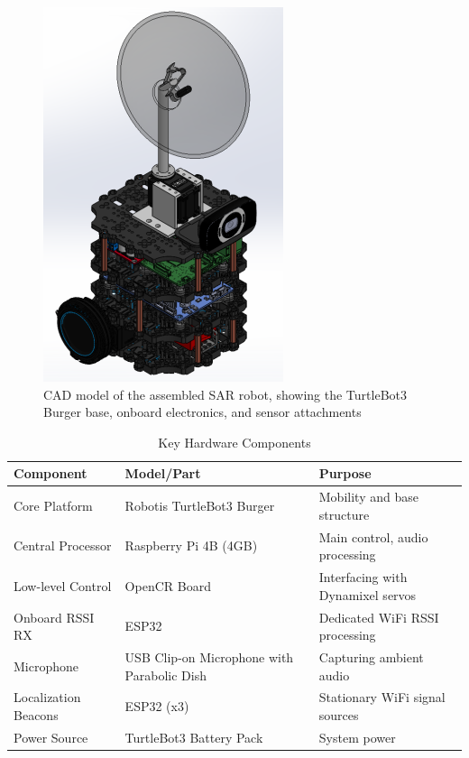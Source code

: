 \begin{figure}[!b]
  \centering
  \includegraphics[width=0.65\linewidth]{img/robotcad.png}
  \caption{CAD model of the assembled SAR robot, showing the TurtleBot3 Burger base, onboard electronics, and sensor attachments}
  \label{fig:robotCAD}
\end{figure}

\begin{table}[t]
  \caption{Key Hardware Components}
  \label{tab:hardware_components}
  \centering
  \begin{tabular}{lll}
    \toprule
    \textbf{Component} & \textbf{Model/Part} & \textbf{Purpose} \\
    \midrule
    Core Platform & Robotis TurtleBot3 Burger & Mobility and base structure \\
    Central Processor & Raspberry Pi 4B (4GB) & Main control, audio processing \\
    Low-level Control & OpenCR Board & Interfacing with Dynamixel servos \\
    Onboard RSSI RX & ESP32 & Dedicated WiFi RSSI processing \\
    Microphone & USB Clip-on Microphone with Parabolic Dish & Capturing ambient audio \\
    Localization Beacons & ESP32 (x3) & Stationary WiFi signal sources \\
    Power Source & TurtleBot3 Battery Pack & System power \\
    \bottomrule
  \end{tabular}
\end{table}

